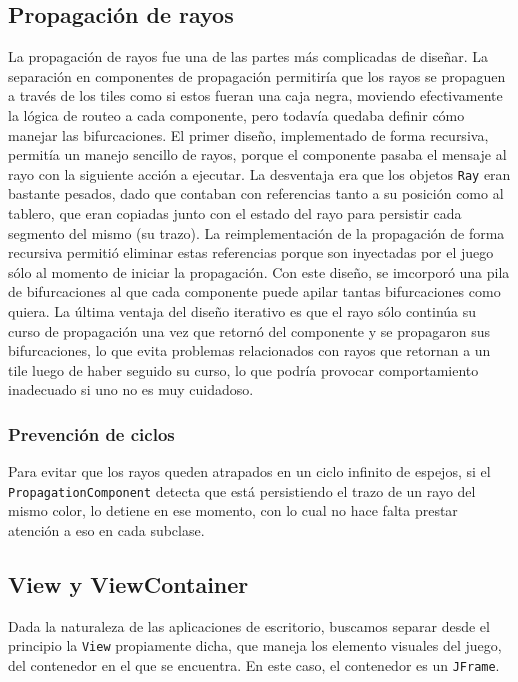 \documentclass[a4paper, 11pt]{article}
\begin{document}
	\subsection{Propagación de rayos}
	La propagación de rayos fue una de las partes más complicadas de diseñar. La separación en componentes de propagación permitiría que los rayos se propaguen a través de los tiles como si estos fueran una caja negra, moviendo efectivamente la lógica de routeo a cada componente, pero todavía quedaba definir cómo manejar las bifurcaciones. El primer diseño, implementado de forma recursiva, permitía un manejo sencillo de rayos, porque el componente pasaba el mensaje al rayo con la siguiente acción a ejecutar. La desventaja era que los objetos \texttt{Ray} eran bastante pesados, dado que contaban con referencias tanto a su posición como al tablero, que eran copiadas junto con el estado del rayo para persistir cada segmento del mismo (su trazo). La reimplementación de la propagación de forma recursiva permitió eliminar estas referencias porque son inyectadas por el juego sólo al momento de iniciar la propagación. Con este diseño, se imcorporó una pila de bifurcaciones al que cada componente puede apilar tantas bifurcaciones como quiera. La última ventaja del diseño iterativo es que el rayo sólo continúa su curso de propagación una vez que retornó del componente y se propagaron sus bifurcaciones, lo que evita problemas relacionados con rayos que retornan a un tile luego de haber seguido su curso, lo que podría provocar comportamiento inadecuado si uno no es muy cuidadoso.

	\subsubsection{Prevención de ciclos}
	Para evitar que los rayos queden atrapados en un ciclo infinito de espejos, si el \texttt{PropagationComponent} detecta que está persistiendo el trazo de un rayo del mismo color, lo detiene en ese momento, con lo cual no hace falta prestar atención a eso en cada subclase.

	\subsection{View y ViewContainer}
	Dada la naturaleza de las aplicaciones de escritorio, buscamos separar desde el principio la \texttt{View} propiamente dicha, que maneja los elemento visuales del juego, del contenedor en el que se encuentra. En este caso, el contenedor es un \texttt{JFrame}.
\end{document}
